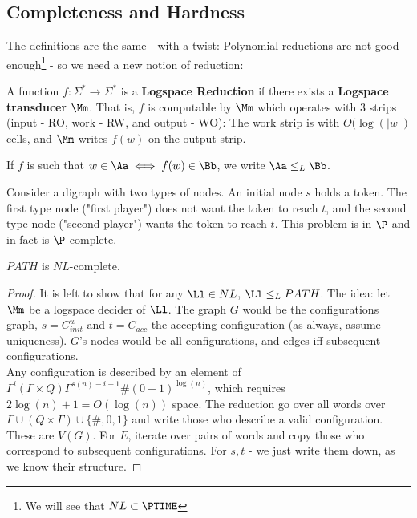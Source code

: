\subsection*{Completeness and Hardness}
The definitions are the same - with a twist: Polynomial reductions are not good enough\footnote{We will see that $NL\subset \PTIME$} - so we need a new notion of reduction:
\begin{yellowBox}
	\begin{defn}
		A function $f:\Sigma^*\to \Sigma^*$ is a \textbf{Logspace Reduction} if there exists a \textbf{Logspace transducer} $\Mm$. That is, $f$ is computable by $\Mm$ which operates with $3$ strips (input - RO, work - RW, and output - WO): The work strip is with $O(\log(|w|)$ cells, and $\Mm$ writes $f(w)$ on the output strip.
	\end{defn}
\begin{remark}
	If $f$ is such that $w\in \Aa \iff f(w)\in \Bb$, we write $\Aa\leq_L \Bb$.
\end{remark}
\end{yellowBox}
\begin{example}
	Consider a digraph with two types of nodes. An initial node $s$ holds a token. The first type node ("first player") does not want the token to reach $t$, and the second type node ("second player") wants the token to reach $t$. This problem is in $\P$ and in fact is $\P$-complete.
\end{example}
\begin{blueBox}
	\begin{thm}
		$PATH$ is $NL$-complete.
	\end{thm}
\end{blueBox}
\begin{proof}
	It is left to show that for any $\Ll\in NL$, $\Ll\leq_L PATH$. The idea: let $\Mm$ be a logspace decider of $\Ll$. The graph $G$ would be the configurations graph, $s=  C^w_{init}$ and $t = C_{acc}$ the accepting configuration (as always, assume uniqueness). $G$'s nodes would be all configurations, and edges iff subsequent configurations.\\
	Any configuration is described by an element of $\Gamma^i (\Gamma\times Q)\Gamma^{s(n) - i+1}\# (0+1)^{\log(n)}$, which requires $2\log(n) + 1 = O(\log(n))$ space. The reduction go over all words over $\Gamma\cup (Q\times \Gamma)\cup \{\#,0,1\}$ and write those who describe a valid configuration. These are $V(G)$. For $E$, iterate over pairs of words and copy those who correspond to subsequent configurations. For $s,t$ - we just write them down, as we know their structure.
\end{proof}
